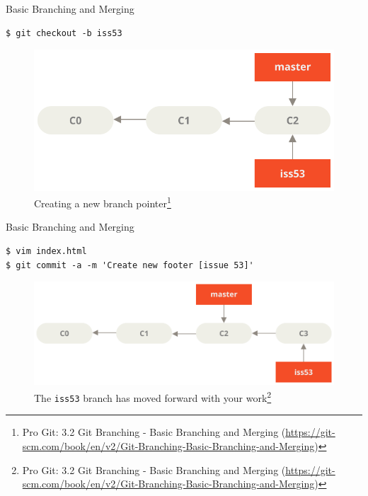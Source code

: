 \documentclass[aspectratio=169]{beamer}
\renewcommand{\footnotesize}{\tiny}
\newcommand{\sectiontitle}{}
\begin{document}
\begin{frame}[fragile]{Basic Branching and Merging}{\sectiontitle}
\begin{verbatim}
$ git checkout -b iss53
\end{verbatim}
\begin{figure}
    \centering
    \includegraphics[width=\textwidth,height=0.5\textheight,keepaspectratio]{basic-branching-2}
    \caption{
        Creating a new branch pointer\footnote{
            Pro Git: 3.2 Git Branching - Basic Branching and Merging
            (\url{https://git-scm.com/book/en/v2/Git-Branching-Basic-Branching-and-Merging})
        }
    }
\end{figure}
\end{frame}

\begin{frame}[fragile]{Basic Branching and Merging}{\sectiontitle}
\begin{verbatim}
$ vim index.html
$ git commit -a -m 'Create new footer [issue 53]'
\end{verbatim}
\begin{figure}
    \centering
    \includegraphics[width=\textwidth,height=0.5\textheight,keepaspectratio]{basic-branching-3}
    \caption{
        The \texttt{iss53} branch has moved forward with your work\footnote{
            Pro Git: 3.2 Git Branching - Basic Branching and Merging
            (\url{https://git-scm.com/book/en/v2/Git-Branching-Basic-Branching-and-Merging})
        }
    }
\end{figure}
\end{frame}
\end{document}

